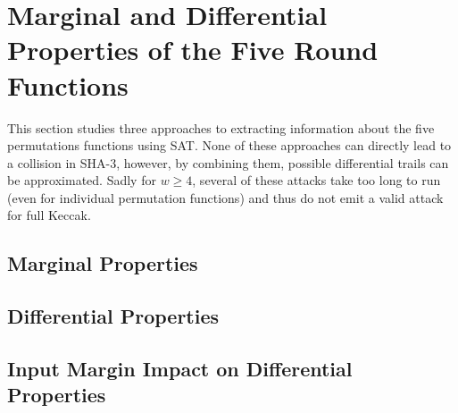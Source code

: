 \documentclass[10pt,twocolumn,twoside]{pnas-new}
\begin{document}






\section{Marginal and Differential Properties of the Five Round Functions} \label{sec:differentials}

This section studies three approaches to extracting information about the five
permutations functions using SAT. None of these approaches can directly lead
to a collision in SHA-3, however, by combining them, possible differential
trails can be approximated. Sadly for $w \geq 4$, several of these attacks take
too long to run (even for individual permutation functions) and thus do not
emit a valid attack for full Keccak.


\subsection{Marginal Properties} \label{sec:d:margin}




\subsection{Differential Properties} \label{sec:d:diff}


\subsection{Input Margin Impact on Differential Properties} \label{sec:d:input}
\end{document}

